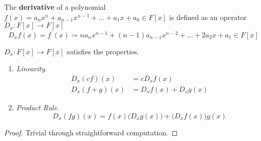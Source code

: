   \begin{definition}[Derivative]
    The \textbf{derivative} of a polynomial $f(x) = a_n x^n + a_{n-1} x^{n-1} + \ldots + a_1 x + a_0 \in F[x]$ is defined as an operator $D_x : F[x] \to F[x]$ 
    \begin{equation}
      D_x f(x) = f^\prime (x) \coloneqq n a_n x^{n-1} + (n-1) a_{n-1} x^{n-2} + \ldots + 2 a_2 x + a_1 \in F[x] 
    \end{equation}
  \end{definition}

  \begin{lemma}
    $D_x: F[x] \to F[x]$ satisfies the properties. 
    \begin{enumerate}
      \item \textit{Linearity}. 
        \begin{align}
          D_x (cf)(x) & = c D_x f(x) \\
          D_x (f + g)(x) & = D_x f(x) + D_x g(x) 
        \end{align}

      \item \textit{Product Rule}. 
        \begin{equation}
          D_x (fg)(x) = f(x) \big( D_x g(x) \big) + \big( D_x f(x) \big) g(x)
        \end{equation}
    \end{enumerate}
  \end{lemma}
  \begin{proof}
    Trivial through straightforward computation. 
  \end{proof}

